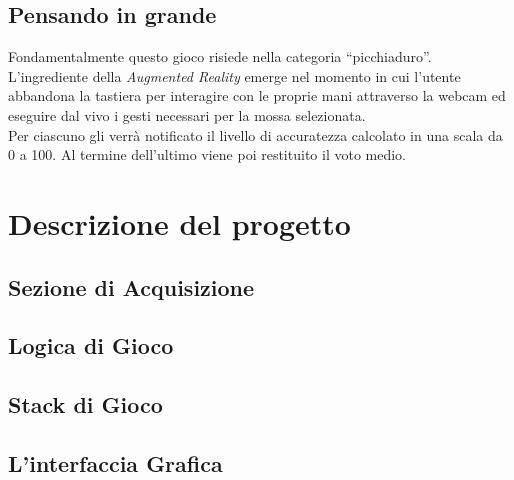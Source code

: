 \documentclass[a4paper,10pt, twocolumn]{article}
\begin{document}
  \subsection{Pensando in grande}
  Fondamentalmente questo gioco risiede nella categoria ``picchiaduro''.
  L'ingrediente della \emph{Augmented Reality} emerge nel
  momento in cui l'utente abbandona la tastiera per interagire con le proprie mani 
  attraverso la webcam ed eseguire dal vivo i gesti necessari per la mossa selezionata.\\
  Per ciascuno gli verr\`{a} notificato il livello di accuratezza 
  calcolato in una scala da 0 a 100.
  Al termine dell'ultimo viene poi restituito il voto medio.
  


  
  
\section{Descrizione del progetto}
  \subsection{Sezione di Acquisizione}
  \subsection{Logica di Gioco}
  \subsection{Stack di Gioco}
  \subsection{L'interfaccia Grafica}
\end{document}

